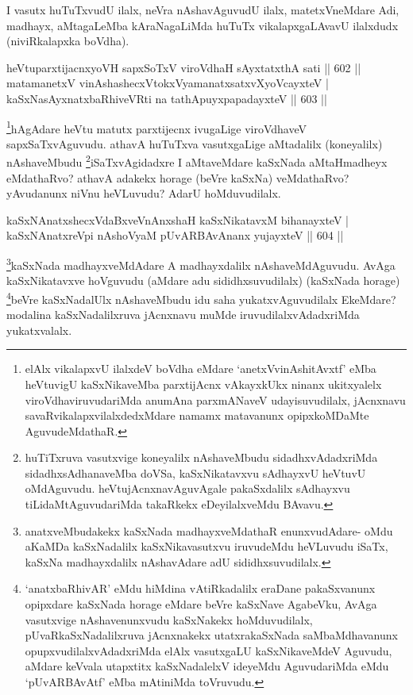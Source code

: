 \begin{artha}
I vasutx huTuTxvudU ilalx, neVra nAshavAguvudU ilalx, matetxVneMdare Adi, madhayx, aMtagaLeMba kAraNagaLiMda huTuTx vikalapxgaLAvavU ilalxdudx (niviRkalapxka boVdha).
\end{artha}


\begin{shl}
heVtuparxtijacnxyoVH sapxSoTxV viroVdhaH sAyxtatxthA sati \hfill||  602 ||  \\
matamanetxV vinAshashecxVtokxV\s yamanatxsatxvXyoVcayxteV | \\
kaSxNasAyxnatxbaRhiveVRti na tathA\s puyxpapadayxteV \hfill||  603 ||  
\end{shl}

\begin{artha}
\footnote{elAlx vikalapxvU ilalxdeV boVdha eMdare `anetxVvinAshitAvxtf' eMba heVtuvigU kaSxNikaveMba parxtijAcnx vAkayxkUkx ninanx ukitxyalelx viroVdhaviruvudariMda anumAna parxmANaveV udayisuvudilalx, jAcnxnavu savaRvikalapxvilalxdedxMdare namamx matavanunx opipxkoMDaMte AguvudeMdathaR.}hAgAdare heVtu matutx parxtijecnx ivugaLige viroVdhaveV sapxSaTxvAguvudu. athavA huTuTxva vasutxgaLige aMtadalilx (koneyalilx) nAshaveMbudu \footnote{huTiTxruva vasutxvige koneyalilx nAshaveMbudu sidadhxvAdadxriMda sidadhxsAdhanaveMba doVSa, kaSxNikatavxvu sAdhayxvU heVtuvU oMdAguvudu. heVtujAcnxnavAguvAgale pakaSxdalilx sAdhayxvu tiLidaMtAguvudariMda takaRkekx eDeyilalxveMdu BAvavu.}iSaTxvAgidadxre I aMtaveMdare kaSxNada aMtaHmadheyx eMdathaRvo? athavA adakekx horage (beVre kaSxNa) veMdathaRvo? yAvudanunx niVnu heVLuvudu? AdarU hoMduvudilalx.
\end{artha}


\begin{shl}
kaSxNAnatxshecxVdaBxveVnAnxshaH kaSxNikatavxM bihanayxteV | \\
kaSxNAnatxreV\s pi nAshoV\s yaM pUvARBAvAnanx yujayxteV \hfill||  604 ||  
\end{shl}

\begin{artha}
\footnote[3]{anatxveMbudakekx kaSxNada madhayxveMdathaR enunxvudAdare- oMdu aKaMDa kaSxNadalilx kaSxNikavasutxvu iruvudeMdu heVLuvudu iSaTx, kaSxNa madhayxdalilx nAshavAdare adU sididhxsuvudilalx.}kaSxNada madhayxveMdAdare A madhayxdalilx nAshaveMdAguvudu. AvAga kaSxNikatavxve hoVguvudu (aMdare adu sididhxsuvudilalx) (kaSxNada horage) \footnote[4]{`anatxbaRhivAR' eMdu hiMdina vAtiRkadalilx eraDane pakaSxvanunx opipxdare kaSxNada horage eMdare beVre kaSxNave AgabeVku, AvAga vasutxvige nAshavenunxvudu kaSxNakekx hoMduvudilalx, pUvaRkaSxNadalilxruva jAcnxnakekx utatxrakaSxNada saMbaMdhavanunx opupxvudilalxvAdadxriMda elAlx vasutxgaLU kaSxNikaveMdeV Aguvudu, aMdare keVvala utapxtitx kaSxNadalelxV ideyeMdu AguvudariMda eMdu `pUvARBAvAtf' eMba mAtiniMda toVruvudu.}beVre kaSxNadalUlx nAshaveMbudu idu saha yukatxvAguvudilalx EkeMdare? modalina kaSxNadalilxruva jAcnxnavu muMde iruvudilalxvAdadxriMda yukatxvalalx.
\end{artha}

